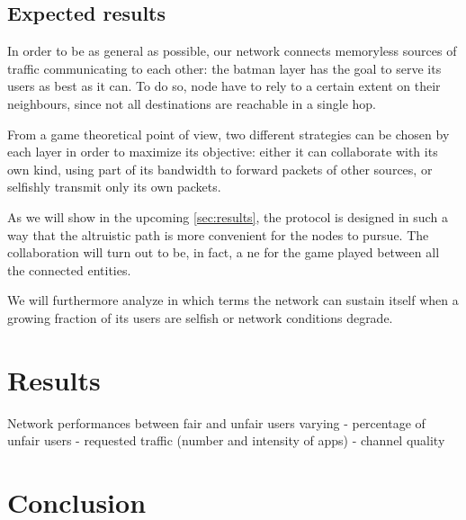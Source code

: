 \documentclass[conference]{IEEEtran}
\begin{document}
\subsection{Expected results}

In order to be as general as possible, our network connects memoryless sources
of traffic communicating to each other: the \gls{batman} layer has the goal to
serve its users as best as it can. To do so, node have to rely to a certain
extent on their neighbours, since not all destinations are reachable in a single
hop.

From a game theoretical point of view, two different strategies can be chosen by
each layer in order to maximize its objective: either it can collaborate with
its own kind, using part of its bandwidth to forward packets of other sources,
or selfishly transmit only its own packets.

As we will show in the upcoming \autoref{sec:results}, the protocol is designed
in such a way that the altruistic path is more convenient for the nodes to
pursue. The collaboration will turn out to be, in fact, a \gls{ne} for the game
played between all the connected entities.

We will furthermore analyze in which terms the network can sustain itself when a
growing fraction of its users are selfish or network conditions degrade.


\section{Results} \label{sec:results}

Network performances between fair and unfair users varying
- percentage of unfair users
- requested traffic (number and intensity of apps)
- channel quality

\section{Conclusion}


% 
\end{document}
